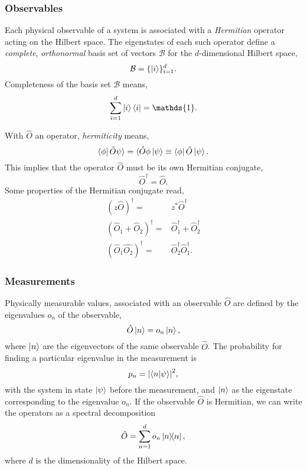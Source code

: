     \subsubsection{Observables}
    Each physical observable of a system is associated with a \emph{Hermitian}
    operator acting on the Hilbert space. The eigenstates of each such
    operator define a \emph{complete}, \emph{orthonormal} basis set of vectors
    $\mathcal{B}$ for the $d$-dimensional Hilbert space,
    \begin{equation}
        \mathcal{B} = \{\ket{i}\}_{i=1}^d.
    \end{equation}
    Completeness of the basis set $\mathcal{B}$ means,
    \begin{equation}
        \sum_{i=1}^d \ket{i}\bra{i} = \mathds{1}.
    \end{equation}

    With $\hat{O}$ an operator, \emph{hermiticity} means,
    \begin{equation}
        \bra{\phi}\hat{O}\psi\rangle = \langle\hat{O}\phi\ket{\psi} \equiv \bra{\phi} \hat{O} \ket{\psi}.
    \end{equation}
    This implies that the operator $\hat{O}$ must be its own Hermitian conjugate,
    \begin{equation}
        \hat{O}^\dagger = \hat{O}.
    \end{equation}
    Some properties of the Hermitian conjugate read,
    \begin{align}
       (z\hat{O})^\dagger =& z^*\hat{O}^\dagger \\
       (\hat{O}_1 + \hat{O}_2)^\dagger =& \hat{O}_1^\dagger + \hat{O}_2^\dagger \\
       (\hat{O}_1\hat{O_2})^\dagger =& \hat{O}_2^\dagger \hat{O}_1^\dagger.
    \end{align}

    \subsubsection{Measurements}
    Physically measurable values, associated with an observable $\hat{O}$ are defined by the 
    eigenvalues $o_n$ of the observable,
    \begin{equation}
        \hat{O}\ket{n} = o_n\ket{n},
    \end{equation}
    where $\ket{n}$ are the eigenvectors of the same observable $\hat{O}$.
    The probability for finding a particular eigenvalue in the measurement is
    \begin{equation}
        p_n = \abs{\braket{n}{\psi}}^2,
    \end{equation}
    with the system in state $\ket{\psi}$ before the measurement, and $\ket{n}$ as the 
    eigenstate corresponding to the eigenvalue $o_n$.
    If the observable $\hat{O}$ is Hermitian, we can write the operators as a spectral 
    decomposition 
    \begin{equation}
        \hat{O} = \sum_{n=1}^d o_n \dyad{n},
    \end{equation}
    where $d$ is the dimensionality of the Hilbert space.

